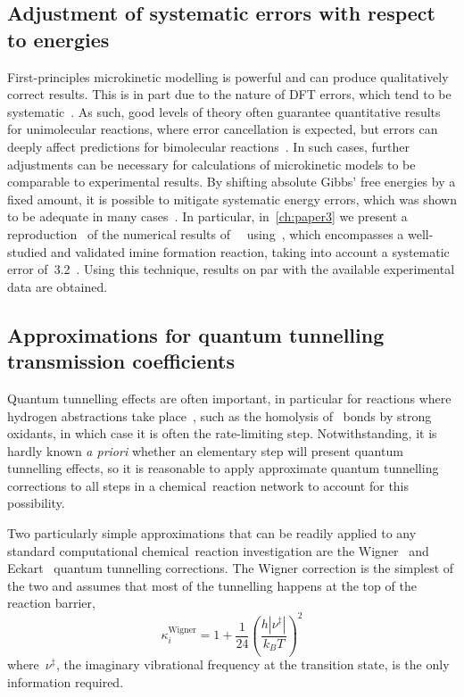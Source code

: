 \subsection{Adjustment of systematic errors with respect to energies}%
\label{sec:rates-error-prop-adj}

First-principles microkinetic modelling is powerful and can produce qualitatively correct results.
This is in part due to the nature of DFT errors,
which tend to be systematic~\cite{P_rez_Soto_2020}.
As such,
good levels of theory often guarantee quantitative results for unimolecular reactions,
where error cancellation is expected,
but errors can deeply affect predictions for bimolecular reactions~\cite{P_rez_Soto_2020}.
In such cases,
further adjustments can be necessary for calculations of microkinetic models to be comparable to experimental results.
By shifting absolute Gibbs' free energies by a fixed amount,
it is possible to mitigate systematic energy errors,
which was shown to be adequate in many cases~\cite{Ahn_2019,P_rez_Soto_2020}.
In particular,
in~\cref{ch:paper3} we present a reproduction~\cite{Schneider_2022} of the numerical results of~\citeauthor{P_rez_Soto_2020}~\cite{P_rez_Soto_2020} using~\overreact{},
which encompasses a well-studied and validated imine formation reaction,
taking into account a systematic error of~3.2~\kcalmol.
Using this technique,
results on par with the available experimental data are obtained.

\subsection{Approximations for quantum tunnelling transmission coefficients}%
\label{sec:tunnelling}

Quantum tunnelling effects are often important,
in particular for reactions where hydrogen abstractions take place~\cite{Bim2018},
such as the homolysis of~ bonds by strong oxidants,
in which case it is often the rate-limiting step.
Notwithstanding,
it is hardly known \emph{a priori} whether an elementary step will present quantum tunnelling effects,
so it is reasonable to apply approximate quantum tunnelling corrections to all steps in a chemical~reaction network
to account for this possibility.

Two particularly simple approximations that can be readily applied to any standard computational chemical~reaction investigation are the Wigner~\cite{Wigner_1932} and Eckart~\cite{Eckart_1930} quantum tunnelling corrections.
The Wigner correction is the simplest of the two and assumes that most of the tunnelling happens at the top of the reaction barrier,
%
\begin{equation}
	\kappa_i^\text{Wigner}
	= 1 + \frac{1}{24}
	\left(
	\frac{
		h | \nu^\ddagger |
	}{k_B T}
	\right)^2
\end{equation}
%
where~$\nu^\ddagger$,
the imaginary vibrational frequency at the transition state,
is the only information required.

